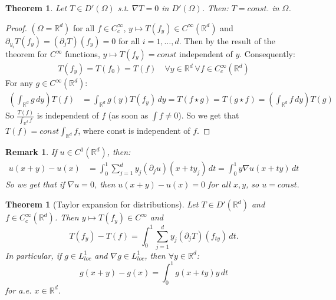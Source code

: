 \documentclass{report}
\theoremstyle{tommy}
\newtheorem{thm}[defn]{Theorem}
\newtheorem{rem}[defn]{Remark}
\begin{document}
  \begin{thm}
    Let \(T \in D'(\Omega)\) s.t. \(\nabla T = 0\) in \(D'(\Omega)\). Then: \(T = const.\) in \(\Omega\).
  \end{thm}

  \begin{proof}
    \((\Omega = \mathbb{R}^d)\) for all \(f \in C_c^\infty\), \(y \mapsto T(f_y) \in C^\infty(\mathbb{R}^d)\) and \(\partial_{y_i} T(f_y) = (\partial_j T)(f_y) = 0\) for all \(i = 1, \dots, d\). Then by the result of the theorem for \(C^\infty\) functions,
    \(y \mapsto T(f_y) = const\) independent of \(y\). Consequently:
    \begin{align*}
      T(f_y) = T(f_0) = T(f) \quad \forall y \in \mathbb{R}^d \ \forall f \in C_c^\infty(\mathbb{R}^d)
    \end{align*}
    For any \(g \in C^\infty(\mathbb{R}^d)\):
    \begin{align*}
      \left(\int_{\mathbb{R}^d} g \, dy\right) T(f)
      &= \int_{\mathbb{R}^d} g(y) T(f_y) \, dy
      = T(f \star g)
      = T(g \star f)
      = \left(\int_{\mathbb{R}^d} f \, dy\right) T(g)
    \end{align*}
    So \(\frac{T(f)}{\int_{\mathbb{R}^d}f}\) is independent of \(f\) (as soon as \(\int f \ne 0\)). So we get that \(T(f) = const \int_{\mathbb{R}^d} f\), where const is independent of \(f\).
  \end{proof}
  
  \begin{rem}
    If \(u \in C^1(\mathbb{R}^d)\), then:
      \begin{align*}
        u(x+y) - u(x) 
        &= \int_0^1 \sum_{j=1}^d y_j (\partial_j u)(x + ty_j) \, dt
        = \int_0^1 y \nabla u(x+ty) \, dt
      \end{align*}
      So we get that if \(\nabla u = 0\), then \(u(x+y) - u(x) = 0\) for all \(x,y\), so \(u = const.\)
  \end{rem}

  \begin{thm}[Taylor expansion for distributions]
    Let \(
      T \in D'(\mathbb{R}^d)\) and \(f \in C_c^\infty(\mathbb{R}^d)\). Then \(y \mapsto T(f_y) \in C^\infty\)
       and 
    \[T(f_y) - T(f) = \int_0^1 \sum_{j=1}^d y_j(\partial_j T) (f_{ty}) \, dt.\]
    In particular, if \(g \in L_{loc}^1\) and \(\nabla g \in L_{loc}^1\), then \(\forall y \in \mathbb{R}^d\):
    \[g (x+y) - g(x) = \int_0^1 g(x + ty) y \, dt\]
    for a.e. \(x \in \mathbb{R}^d\).
  \end{thm}
\end{document}

